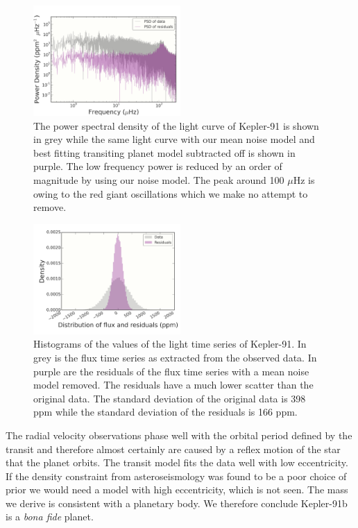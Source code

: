 \documentclass[apjl]{emulateapj}
\begin{document}
 \begin{figure}
\includegraphics[width=0.50\textwidth]{PSD.pdf}
\caption{The power spectral density of the light curve of Kepler-91 is shown in grey while the same light curve with our mean noise model and best fitting transiting planet model subtracted off is shown in purple. The low frequency power is reduced by an order of magnitude by using our noise model. The peak around 100 $\mu$Hz is owing to the red giant oscillations which we make no attempt to remove.}
\label{fig:PSD}
\end{figure}

 \begin{figure}
\includegraphics[width=0.50\textwidth]{hist_vals_resid.pdf}
\caption{Histograms of the values of the light time series of Kepler-91. In grey is the flux time series as extracted from the observed data. In purple are the residuals of the flux time series with a mean noise model removed. The residuals have a much lower scatter than the original data. The standard deviation of the original data is 398 ppm while the standard deviation of the residuals is 166 ppm.}
\label{fig:hist_resid}
\end{figure}


The radial velocity observations phase well with the orbital period defined by the transit and therefore almost certainly are caused by a reflex motion of the star that the planet orbits. The transit model fits the data well with low eccentricity. If the density constraint from asteroseismology was found to be a poor choice of prior we would need a model with high eccentricity, which is not seen. The mass we derive is consistent with a planetary body. We therefore conclude Kepler-91b is a \emph{bona fide} planet.
\end{document}
